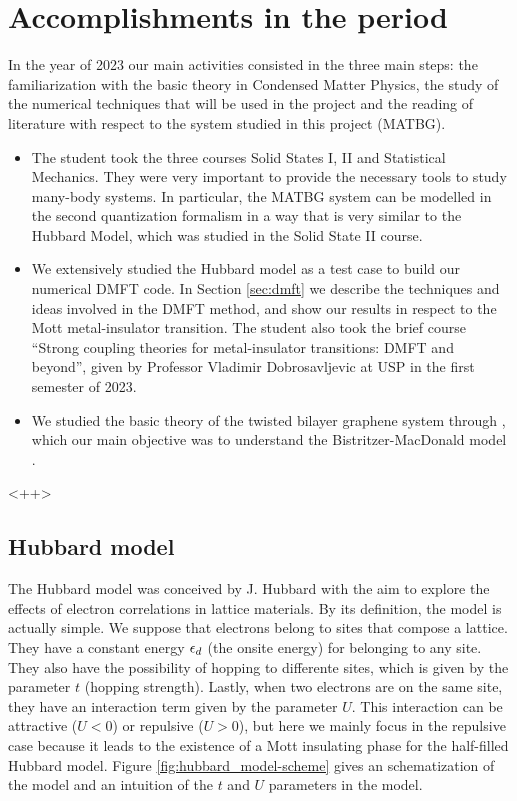\documentclass[12pt]{report}
\begin{document}
\chapter{Accomplishments in the period} \label{chp:accomplishments}

In the year of 2023 our main activities consisted in the three main steps: the familiarization with the basic theory in Condensed Matter Physics, the study of the numerical techniques that will be used in the project and the reading of literature with respect to the system studied in this project (MATBG).

\begin{itemize}
\item The student took the three courses Solid States I, II and Statistical Mechanics. They were very important to provide the necessary tools to study many-body systems. In particular, the MATBG system can be modelled in the second quantization formalism in a way that is very similar to the Hubbard Model, which was studied in the Solid State II course.

\item We extensively studied the Hubbard model \cite{hubbard1963} as a test case to build our numerical DMFT code. In Section \ref{sec:dmft} we describe the techniques and ideas involved in the DMFT method, and show our results in respect to the Mott metal-insulator transition. The student also took the brief course ``Strong coupling theories for metal-insulator transitions: DMFT and beyond'', given by Professor Vladimir Dobrosavljevic at USP in the first semester of 2023.

\item We studied the basic theory of the twisted bilayer graphene system through \cite{handbook2019}, which our main objective was to understand the Bistritzer-MacDonald model \cite{macdonald2011}.
\end{itemize}
<++>

\section{Hubbard model} \label{sec:hubbard}


The Hubbard model was conceived by J. Hubbard with the aim to explore the effects of electron correlations in lattice materials. By its definition, the model is actually simple. We suppose that electrons belong to sites that compose a lattice. They have a constant energy $\epsilon_d$ (the onsite energy) for belonging to any site. They also have the possibility of hopping to differente sites, which is given by the parameter $t$ (hopping strength). Lastly, when two electrons are on the same site, they have an interaction term given by the parameter $U$. This interaction can be attractive ($U < 0$) or repulsive ($U > 0$), but here we mainly focus in the repulsive case because it leads to the existence of a Mott insulating phase \cite{georges1996} for the half-filled Hubbard model. Figure \ref{fig:hubbard_model-scheme} gives an schematization of the model and an intuition of the $t$ and $U$ parameters in the model.
\end{document}
